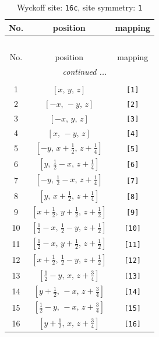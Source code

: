 \documentclass[fleqn,8pt]{jsarticle}
\begin{document}
\begin{longtable}{ccc}
\caption{Wyckoff site: {\tt 16c}, site symmetry: {\tt 1}}
 \\
 \hline \hline
No. & position & mapping \\ \hline \endfirsthead

\multicolumn{2}{l}{\tablename\ \thetable{}} \\
 \hline \hline
No. & position & mapping \\ \hline \endhead

 \hline \hline
\multicolumn{2}{r}{\footnotesize\it continued ...} \\ \endfoot

 \hline \hline
\multicolumn{2}{r}{} \\ \endlastfoot

1 & $\left[ x,\, y,\, z \right]$ & {\tt [1]} \\ \hline
2 & $\left[ - x,\, - y,\, z \right]$ & {\tt [2]} \\ \hline
3 & $\left[ - x,\, y,\, z \right]$ & {\tt [3]} \\ \hline
4 & $\left[ x,\, - y,\, z \right]$ & {\tt [4]} \\ \hline
5 & $\left[ - y,\, x + \frac{1}{2},\, z + \frac{1}{4} \right]$ & {\tt [5]} \\ \hline
6 & $\left[ y,\, \frac{1}{2} - x,\, z + \frac{1}{4} \right]$ & {\tt [6]} \\ \hline
7 & $\left[ - y,\, \frac{1}{2} - x,\, z + \frac{1}{4} \right]$ & {\tt [7]} \\ \hline
8 & $\left[ y,\, x + \frac{1}{2},\, z + \frac{1}{4} \right]$ & {\tt [8]} \\ \hline
9 & $\left[ x + \frac{1}{2},\, y + \frac{1}{2},\, z + \frac{1}{2} \right]$ & {\tt [9]} \\ \hline
10 & $\left[ \frac{1}{2} - x,\, \frac{1}{2} - y,\, z + \frac{1}{2} \right]$ & {\tt [10]} \\ \hline
11 & $\left[ \frac{1}{2} - x,\, y + \frac{1}{2},\, z + \frac{1}{2} \right]$ & {\tt [11]} \\ \hline
12 & $\left[ x + \frac{1}{2},\, \frac{1}{2} - y,\, z + \frac{1}{2} \right]$ & {\tt [12]} \\ \hline
13 & $\left[ \frac{1}{2} - y,\, x,\, z + \frac{3}{4} \right]$ & {\tt [13]} \\ \hline
14 & $\left[ y + \frac{1}{2},\, - x,\, z + \frac{3}{4} \right]$ & {\tt [14]} \\ \hline
15 & $\left[ \frac{1}{2} - y,\, - x,\, z + \frac{3}{4} \right]$ & {\tt [15]} \\ \hline
16 & $\left[ y + \frac{1}{2},\, x,\, z + \frac{3}{4} \right]$ & {\tt [16]} \\
\end{longtable}
\end{document}
